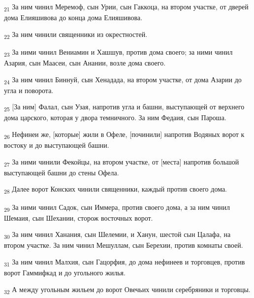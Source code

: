 \begin{tcolorbox}
\textsubscript{21} За ним чинил Меремоф, сын Урии, сын Гаккоца, на втором участке, от дверей дома Елияшивова до конца дома Елияшивова.
\end{tcolorbox}
\begin{tcolorbox}
\textsubscript{22} За ним чинили священники из окрестностей.
\end{tcolorbox}
\begin{tcolorbox}
\textsubscript{23} За ними чинил Вениамин и Хашшув, против дома своего; за ними чинил Азария, сын Маасеи, сын Анании, возле дома своего.
\end{tcolorbox}
\begin{tcolorbox}
\textsubscript{24} За ним чинил Биннуй, сын Хенадада, на втором участке, от дома Азарии до угла и поворота.
\end{tcolorbox}
\begin{tcolorbox}
\textsubscript{25} [За ним] Фалал, сын Узая, напротив угла и башни, выступающей от верхнего дома царского, которая у двора темничного. За ним Федаия, сын Пароша.
\end{tcolorbox}
\begin{tcolorbox}
\textsubscript{26} Нефинеи же, [которые] жили в Офеле, [починили] напротив Водяных ворот к востоку и до выступающей башни.
\end{tcolorbox}
\begin{tcolorbox}
\textsubscript{27} За ними чинили Фекойцы, на втором участке, от [места] напротив большой выступающей башни до стены Офела.
\end{tcolorbox}
\begin{tcolorbox}
\textsubscript{28} Далее ворот Конских чинили священники, каждый против своего дома.
\end{tcolorbox}
\begin{tcolorbox}
\textsubscript{29} За ними чинил Садок, сын Иммера, против своего дома, а за ним чинил Шемаия, сын Шехании, сторож восточных ворот.
\end{tcolorbox}
\begin{tcolorbox}
\textsubscript{30} За ним чинил Ханания, сын Шелемии, и Ханун, шестой сын Цалафа, на втором участке. За ним чинил Мешуллам, сын Берехии, против комнаты своей.
\end{tcolorbox}
\begin{tcolorbox}
\textsubscript{31} За ним чинил Малхия, сын Гацорфия, до дома нефинеев и торговцев, против ворот Гаммифкад и до угольного жилья.
\end{tcolorbox}
\begin{tcolorbox}
\textsubscript{32} А между угольным жильем до ворот Овечьих чинили серебряники и торговцы.
\end{tcolorbox}
